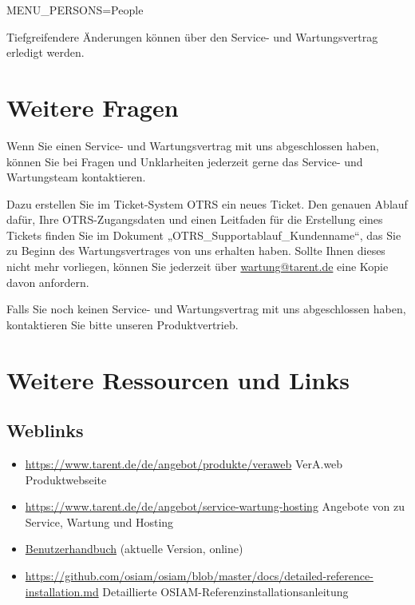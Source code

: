 \begin{lstdumpx}
MENU_PERSONS=People
\end{lstdumpx}

Tiefgreifendere Änderungen können über den Service- und Wartungsvertrag
erledigt werden.
\fi

\section{Weitere Fragen}\label{sec:outro}

Wenn Sie einen Service- und Wartungsvertrag mit uns abgeschlossen
haben, können Sie bei Fragen und Unklarheiten jederzeit gerne das
Service- und Wartungsteam kontaktieren.

Dazu erstellen Sie im Ticket-System OTRS ein neues Ticket. Den
genauen Ablauf dafür, Ihre OTRS-Zugangsdaten und einen Leitfaden
für die Erstellung eines Tickets finden Sie im Dokument
„OTRS\_Supportablauf\_Kundenname“, das Sie zu Beginn des
Wartungsvertrages von uns erhalten haben. Sollte Ihnen dieses
nicht mehr vorliegen, können Sie jederzeit über
\href{mailto:wartung@tarent.de}{wartung@tarent.de} eine Kopie
davon anfordern.

Falls Sie noch keinen Service- und Wartungsvertrag mit uns abgeschlossen
haben, kontaktieren Sie bitte unseren Produktvertrieb.

\section{Weitere Ressourcen und Links}\label{sec:links}

\subsection{Weblinks}\label{subsec:links-web}

\begin{itemize}
 \item{\href{https://www.tarent.de/de/angebot/produkte/veraweb}{https://www.tarent.de/de/angebot/produkte/veraweb}
  \dash VerA.web Produktwebseite}
 \item{\href{https://www.tarent.de/de/angebot/service-wartung-hosting}{https://www.tarent.de/de/angebot/service-wartung-hosting}
  \dash Angebote von  zu\\
  Service, Wartung und Hosting}
 \item{\href{https://evolvis.org/plugins/scmgit/cgi-bin/gitweb.cgi?p=veraweb/veraweb.git;a=blob_plain;f=vwor/src/main/webapp/doc/Benutzerhandbuch.pdf;hb=HEAD}{Benutzerhandbuch}
  (aktuelle Version, online)}
\ifoa
 \item{\href{https://github.com/osiam/osiam/blob/master/docs/detailed-reference-installation.md}{https://github.com/osiam/osiam/blob/master/docs/detailed-reference-installation.md}
  \dash Detaillierte OSIAM-Referenzinstallationsanleitung}
\fi%
\end{itemize}

